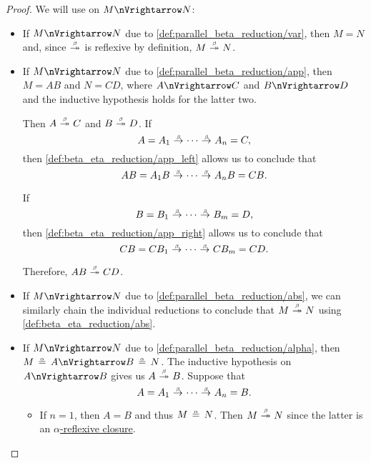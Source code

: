 \begin{proof}
   We will use  on \( M \pred N \):
  \begin{itemize}
    \item If \( M \pred N \) due to \ref{def:parallel_beta_reduction/var}, then \( M = N \) and, since \( {\bred*} \) is reflexive by definition, \( M \bred* N \).

    \item If \( M \pred N \) due to \ref{def:parallel_beta_reduction/app}, then \( M = AB \) and \( N = CD \), where \( A \pred C \) and \( B \pred D \) and the inductive hypothesis holds for the latter two.

    Then \( A \bred* C \) and \( B \bred* D \). If
    \begin{equation*}
      A = A_1 \bred \cdots \bred A_n = C,
    \end{equation*}
    then \ref{def:beta_eta_reduction/app_left} allows us to conclude that
    \begin{equation*}
      AB = A_1 B \bred \cdots \bred A_n B = CB.
    \end{equation*}

    If
    \begin{equation*}
      B = B_1 \bred \cdots \bred B_m = D,
    \end{equation*}
    then \ref{def:beta_eta_reduction/app_right} allows us to conclude that
    \begin{equation*}
      CB = C B_1 \bred \cdots \bred C B_m = CD.
    \end{equation*}

    Therefore, \( AB \bred* CD \).

    \item If \( M \pred N \) due to \ref{def:parallel_beta_reduction/abs}, we can similarly chain the individual reductions to conclude that \( M \bred* N \) using \ref{def:beta_eta_reduction/abs}.

    \item If \( M \pred N \) due to \ref{def:parallel_beta_reduction/alpha}, then \( M \aequiv A \pred B \aequiv N \). The inductive hypothesis on \( A \pred B \) gives us \( A \bred* B \). Suppose that
    \begin{equation*}
      A = A_1 \bred \cdots \bred A_n = B.
    \end{equation*}

    \begin{itemize}
      \item If \( n = 1 \), then \( A = B \) and thus \( M \aequiv N \). Then \( M \bred* N \) since the latter is an \hyperref[def:alpha_reflexive_closure]{\( \alpha \)-reflexive closure}.


\end{itemize}
\end{itemize}
\end{proof}

